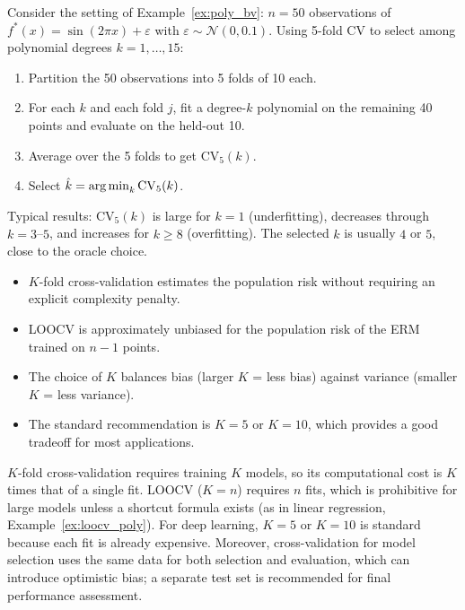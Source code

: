 \documentclass[11pt,a4paper]{article}
\begin{document}
\begin{example}
\label{ex:cv_poly}
Consider the setting of Example~\ref{ex:poly_bv}: $n = 50$
observations of $f^*(x) = \sin(2\pi x) + \varepsilon$ with
$\varepsilon \sim \mathcal{N}(0, 0.1)$.  Using 5-fold CV to select
among polynomial degrees $k = 1, \ldots, 15$:
\begin{enumerate}[nosep]
    \item Partition the 50 observations into 5 folds of 10 each.
    \item For each $k$ and each fold $j$, fit a degree-$k$ polynomial
    on the remaining 40 points and evaluate on the held-out 10.
    \item Average over the 5 folds to get $\mathrm{CV}_5(k)$.
    \item Select $\hat{k} = \operatorname{arg\,min}_k \mathrm{CV}_5(k)$.
\end{enumerate}
Typical results: $\mathrm{CV}_5(k)$ is large for $k = 1$ (underfitting),
decreases through $k = 3$--$5$, and increases for $k \geq 8$
(overfitting).  The selected $\hat{k}$ is usually $4$ or $5$,
close to the oracle choice.
\end{example}

\begin{keyresult}[title={Cross-Validation for Model Selection}]
\begin{itemize}[nosep]
    \item $K$-fold cross-validation estimates the population risk
    without requiring an explicit complexity penalty.
    \item LOOCV is approximately unbiased for the population risk
    of the ERM trained on $n - 1$ points.
    \item The choice of $K$ balances bias (larger $K$ = less bias)
    against variance (smaller $K$ = less variance).
    \item The standard recommendation is $K = 5$ or $K = 10$, which
    provides a good tradeoff for most applications.
\end{itemize}
\end{keyresult}

\begin{warning}[title={Cross-Validation is Not Free}]
$K$-fold cross-validation requires training $K$ models, so its
computational cost is $K$ times that of a single fit.  LOOCV
($K = n$) requires $n$ fits, which is prohibitive for large models
unless a shortcut formula exists (as in linear regression,
Example~\ref{ex:loocv_poly}).  For deep learning, $K = 5$ or
$K = 10$ is standard because each fit is already expensive.
Moreover, cross-validation for model selection uses the same data
for both selection and evaluation, which can introduce optimistic
bias; a separate test set is recommended for final performance
assessment.
\end{warning}
\end{document}
